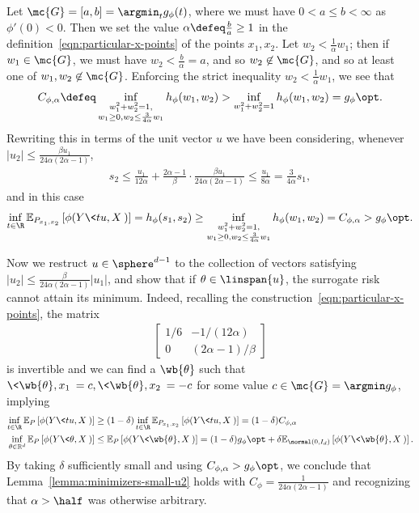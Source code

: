 \documentclass[11pt]{article}
\newcommand{\Ep}{\mathbb{E}}
\newcommand{\real}{\mathbb{R}} %
\newcommand{\brk}[1]{\left[{#1}\right]} %
\newcommand{\dstr}{P}
\begin{document}
Let $\mc{G} = [a, b] = \argmin_t g_\phi(t)$, where
we must have $0 < a \le b < \infty$ as $\phi'(0) < 0$.
%
Then we set the value $\alpha \defeq \frac{b}{a} \ge 1$ in the
definition~\eqref{eqn:particular-x-points} of the points $x_1, x_2$.
%
Let $w_2 < \frac{1}{\alpha} w_1$; then if $w_1 \in \mc{G}$,
we must have $w_2 < \frac{b}{\alpha} = a$, and so
$w_2 \not \in \mc{G}$, and so at least one of
$w_1, w_2 \not \in \mc{G}$.
%
Enforcing the strict inequality $w_2 < \frac{1}{\alpha} w_1$,
we see that
\begin{align*}
  C_{\phi,\alpha}
  \defeq \inf_{\substack{w_1^2 + w_2^2 =1, \\ w_1 \geq 0, w_2 \leq \frac{3}{4\alpha} w_1}}
  h_\phi(w_1, w_2) >  \inf_{w_1^2 + w_2^2 = 1} h_\phi(w_1, w_2) = g_\phi\opt.
\end{align*}
Rewriting this in terms of the unit vector $u$ we have been considering,
whenever $|u_2| \leq \frac{\beta u_1}{24\alpha(2\alpha-1)}$,
\begin{align*}
  s_2 \leq
  \frac{u_1}{12\alpha} +
  \frac{2\alpha-1}{\beta} \cdot \frac{\beta u_1}{24\alpha(2\alpha-1)}
  \leq \frac{u_1}{8 \alpha} = \frac{3}{4\alpha} s_1,
\end{align*} 
and in this case
\begin{align*}
  \inf_{t \in \R} \Ep_{\dstr_{x_1, x_2}}  \brk{\phi(Y \<tu , X\>)}
  = h_\phi(s_1, s_2) \geq
  \inf_{\substack{w_1^2 + w_2^2 =1, \\ w_1 \geq 0, w_2 \leq \frac{3}{4\alpha} w_1}}
  h_\phi(w_1, w_2) = C_{\phi,\alpha} > g_\phi\opt.
\end{align*}

Now we restruct $u \in \sphere^{d-1}$ to the collection of vectors
satisfying $|u_2| \le \frac{\beta}{24 \alpha(2\alpha - 1)} |u_1|$, and show
that if $\theta \in \linspan\{u\}$, the surrogate risk cannot attain its
minimum.
%
Indeed, recalling the construction~\eqref{eqn:particular-x-points},
the matrix
\begin{align*}
  \begin{bmatrix}
    1/6 & -1/(12\alpha) \\
    0 & (2\alpha-1)/\beta
  \end{bmatrix}
\end{align*}
is invertible and we can find a $\wb{\theta}$ such that $\<\wb{\theta},
x_1\> = c, \<\wb{\theta}, x_2\> = -c$ for some value
$c \in \mc{G} = \argmin g_\phi$, implying
\begin{align*}
  \inf_{t \in \R} \Ep_{\dstr} \brk{\phi(Y \<t u, X\>)}
  & \geq (1-\delta) \inf_{t \in \R} \Ep_{\dstr_{x_1, x_2}} \brk{\phi(Y \<t u, X\>)}
  =(1- \delta) C_{\phi,\alpha} \\
  \inf_{\theta \in \real^d} \Ep_{\dstr} \brk{\phi(Y \<\theta, X\>)}
  & \leq \Ep_{\dstr} \brk{\phi(Y \<\wb{\theta}, X\>)}
  = (1-\delta) g_\phi\opt +
  \delta  \Ep_{\normal(0, I_d)} \brk{\phi(Y \<\wb{\theta}, X\>)}.
\end{align*}
By taking $\delta$ sufficiently small and using
$C_{\phi,\alpha} > g_\phi\opt$, we conclude that
Lemma~\ref{lemma:minimizers-small-u2} holds with
$C_\phi = \frac{1}{24 \alpha(2 \alpha - 1)}$
and recognizing that $\alpha > \half$ was otherwise arbitrary.
\end{document}
